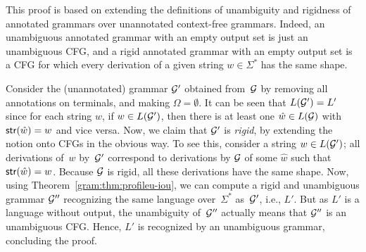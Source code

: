 This proof is based on extending the definitions of unambiguity and rigidness of annotated grammars over unannotated context-free grammars. Indeed, an unambiguous annotated grammar with an empty output set is just an unambiguous CFG, and a rigid annotated grammar with an empty output set is a CFG for which every derivation of a given string $w\in \Sigma^*$ has the same shape.

  Consider the (unannotated) grammar $\mathcal{G}'$ obtained from~$\mathcal{G}$ by removing all
  annotations on terminals, and making $\Omega = \emptyset$. It can be seen that $L(\mathcal{G}') = L'$ since for each string $w$, if $w\in L(\mathcal{G}')$, then there is at least one $\hat{w}\in L(\mathcal{G})$ with $\mathsf{str}(\hat{w}) = w$ and vice versa. Now, we claim that
  $\mathcal{G}'$ is \emph{rigid}, by extending the notion onto CFGs in the obvious way. To see this, consider a string $w \in L(\mathcal{G}')$; all
  derivations of~$w$ by~$\mathcal{G}'$ correspond to derivations by $\mathcal{G}$ of some $\hat{w}$ such that $\mathsf{str}(\hat{w}) =w $. Because $\mathcal{G}$ is rigid, all these derivations have the
  same shape. Now, using Theorem~\ref{gram:thm:profileu-iou}, we can compute a rigid and
  unambiguous grammar $\mathcal{G}''$ recognizing the same language over~$\Sigma^*$
  as~$\mathcal{G}'$, i.e., $L'$. But as $L'$ is a language without output, the
  unambiguity of~$\mathcal{G}''$ actually means that $\mathcal{G}''$ is an unambiguous CFG. Hence, $L'$
  is recognized by an unambiguous grammar, concluding the proof.
